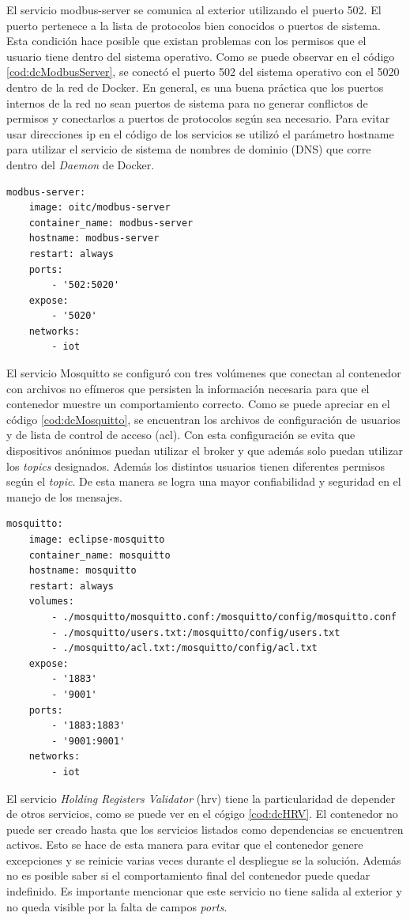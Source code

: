 El servicio modbus-server se comunica al exterior utilizando el puerto 502.
El puerto pertenece a la lista de protocolos bien conocidos o puertos de sistema.
Esta condición hace posible que existan problemas con los permisos que el usuario tiene dentro del sistema operativo.
Como se puede observar en el código \ref{cod:dcModbusServer}, se conectó el puerto 502 del sistema operativo con el 5020 dentro de la red de Docker.
En general, es una buena práctica que los puertos internos de la red no sean puertos de sistema para no generar conflictos de permisos y conectarlos a puertos de protocolos según sea necesario.
Para evitar usar direcciones ip en el código de los servicios se utilizó el parámetro hostname para utilizar el servicio de sistema de nombres de dominio (DNS) que corre dentro del \emph{Daemon} de Docker.

\begin{lstlisting}[label=cod:dcModbusServer,caption=Orquestación del servidor Modbus.]
modbus-server:
	image: oitc/modbus-server
	container_name: modbus-server
	hostname: modbus-server
	restart: always
	ports:
		- '502:5020'
	expose: 
    	- '5020'
	networks: 
		- iot
\end{lstlisting}

El servicio Mosquitto se configuró con tres volúmenes que conectan al contenedor con archivos no efímeros que persisten la información necesaria para que el contenedor muestre un comportamiento correcto.
Como se puede apreciar en el código \ref{cod:dcMosquitto}, se encuentran los archivos de configuración de usuarios y de lista de control de acceso (acl).
Con esta configuración se evita que dispositivos anónimos puedan utilizar el broker y que además solo puedan utilizar los \emph{topics} designados.
Además los distintos usuarios tienen diferentes permisos según el \emph{topic}.
De esta manera se logra una mayor confiabilidad y seguridad en el manejo de los mensajes.

\begin{lstlisting}[label=cod:dcMosquitto,caption=Orquestación del broker Mosquitto.]
mosquitto:
	image: eclipse-mosquitto
	container_name: mosquitto
	hostname: mosquitto
	restart: always
	volumes: 
		- ./mosquitto/mosquitto.conf:/mosquitto/config/mosquitto.conf
		- ./mosquitto/users.txt:/mosquitto/config/users.txt
		- ./mosquitto/acl.txt:/mosquitto/config/acl.txt
	expose: 
		- '1883'
		- '9001'
	ports: 
		- '1883:1883'
		- '9001:9001'
	networks: 
		- iot
\end{lstlisting}

El servicio \emph{Holding Registers Validator} (hrv) tiene la particularidad de depender de otros servicios, como se puede ver en el cógigo \ref{cod:dcHRV}.
El contenedor no puede ser creado hasta que los servicios listados como dependencias se encuentren activos.
Esto se hace de esta manera para evitar que el contenedor genere excepciones y se reinicie varias veces durante el despliegue se la solución.
Además no es posible saber si el comportamiento final del contenedor puede quedar indefinido.
Es importante mencionar que este servicio no tiene salida al exterior y no queda visible por la falta de campos \emph{ports}.

